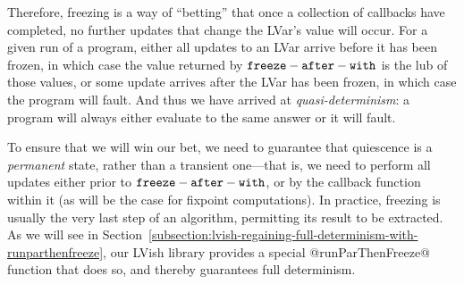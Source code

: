 Therefore, freezing is a way of ``betting'' that once a collection of
callbacks have completed, no further updates that change the LVar's
value will occur.  For a given run of a program, either all updates to
an LVar arrive before it has been frozen, in which case the value
returned by ${\mbox{\texttt{freeze}}-\mbox{\texttt{after}}-\mbox{\texttt{with}}}$ is the lub of those values, or some update arrives
after the LVar has been frozen, in which case the program will fault.
And thus we have arrived at \emph{quasi-determinism}: a program will
always either evaluate to the same answer or it will fault.

To ensure that we will win our bet, we need to guarantee that
quiescence is a \emph{permanent} state, rather than a transient
one---that is, we need to perform all updates either prior to ${\mbox{\texttt{freeze}}-\mbox{\texttt{after}}-\mbox{\texttt{with}}}$,
or by the callback function within it (as will be the case for
fixpoint computations).  In practice, freezing is usually the very
last step of an algorithm, permitting its result to be extracted. As
we will see in
Section~\ref{subsection:lvish-regaining-full-determinism-with-runparthenfreeze},
our LVish library provides a special @runParThenFreeze@ function that
does so, and thereby guarantees full determinism.
